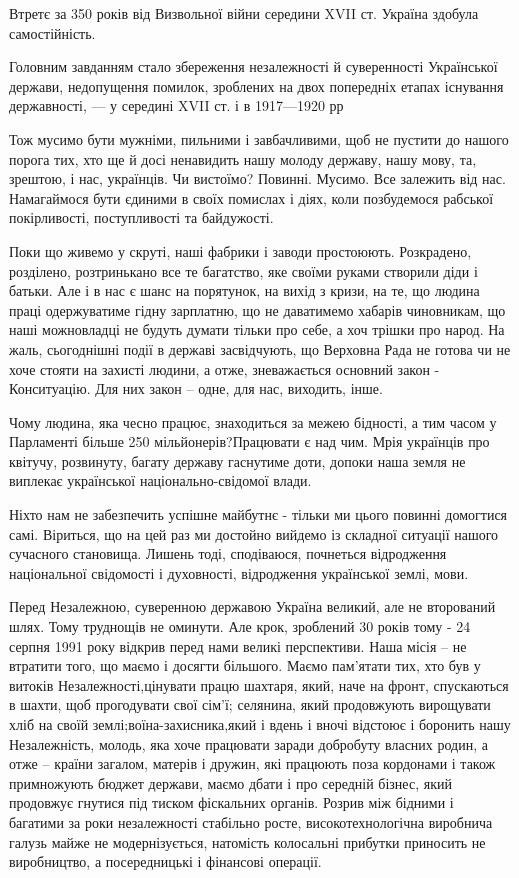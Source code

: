 Втретє за 350 років від Визвольної війни середини XVII ст. Україна здобула
самостійність.

Головним завданням стало збереження незалежності й суверенності Української
держави, недопущення помилок, зроблених на двох попередніх етапах існування
державності, — у середині XVII ст. і в 1917—1920 рр

Тож мусимо бути мужніми, пильними і завбачливими, щоб не пустити до нашого
порога тих, хто ще й досі ненавидить нашу молоду державу, нашу мову, та,
зрештою, і нас, українців. Чи вистоїмо? Повинні. Мусимо. Все залежить від нас.
Намагаймося бути єдиними в своїх помислах і діях, коли позбудемося рабської
покірливості, поступливості та байдужості.

Поки що живемо у скруті, наші фабрики і заводи простоюють. Розкрадено,
розділено, розтринькано все те багатство, яке своїми руками створили діди і
батьки. Але і в нас є шанс на порятунок, на вихід з кризи, на те, що людина
праці одержуватиме  гідну зарплатню, що не даватимемо хабарів чиновникам, що
наші можновладці не будуть думати тільки про себе, а хоч трішки про народ. На
жаль, сьогоднішні події в державі засвідчують, що Верховна Рада не готова чи не
хоче стояти на захисті людини, а отже, зневажається основний закон - Конситуацію. 
Для них закон – одне, для нас, виходить, інше.

Чому людина, яка чесно працює, знаходиться за межею бідності, а тим часом у
Парламенті більше 250 мільйонерів?Працювати є над чим.   Мрія українців про
квітучу, розвинуту, багату державу гаснутиме доти, допоки наша земля не
виплекає української національно-свідомої  влади.

Ніхто нам не забезпечить успішне майбутнє - тільки ми цього повинні домогтися
самі. Віриться, що на цей раз ми достойно вийдемо із складної ситуації нашого
сучасного становища. Лишень тоді, сподіваюся, почнеться відродження національної
свідомості і духовності, відродження української землі, мови.

Перед Незалежною, суверенною державою Україна великий, але не вторований
шлях. Тому труднощів не оминути. Але крок, зроблений 30 років тому - 24
серпня 1991 року   відкрив перед нами великі перспективи. Наша місія – не
втратити того, що маємо і досягти більшого. Маємо пам’ятати тих, хто був у
витоків Незалежності,цінувати працю шахтаря, який, наче на фронт,
спускаються в шахти, щоб прогодувати свої сім’ї; селянина, який продовжують
вирощувати хліб на своїй землі;воїна-захисника,який і вдень і вночі
відстоює і боронить нашу Незалежність, молодь, яка хоче працювати заради
добробуту власних родин, а отже – країни загалом, матерів і дружин, які
працюють поза кордонами і також примножують бюджет держави, маємо дбати і
про середній бізнес, який  продовжує гнутися під тиском фіскальних органів.
Розрив між бідними і багатими за роки незалежності стабільно росте,
високотехнологічна виробнича галузь майже не модернізується, натомість
колосальні прибутки приносить не виробництво, а посередницькі і фінансові
операції.


